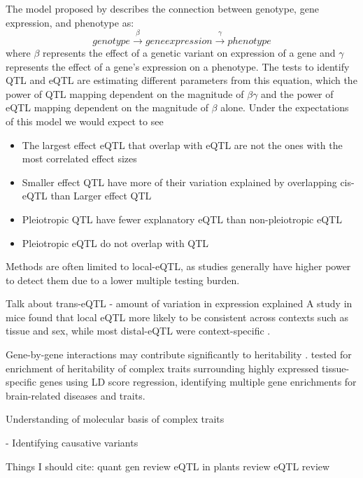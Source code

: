 \documentclass[article,9pt,twocolumn,twoside]{rilabRxiv}
\begin{document}
The model proposed by \cite{Mostafavi} describes the connection between genotype, gene expression, and phenotype as:
    \begin{equation} 
    \label{eqn:mostafavi}
   genotype\xrightarrow{\beta}gene expression\xrightarrow{\gamma}phenotype
    \end{equation}
where $\beta$ represents the effect of a genetic variant on expression of a gene and $\gamma$ represents the effect of a gene's expression on a phenotype. 
The tests to identify QTL and eQTL are estimating different parameters from this equation, which the power of QTL mapping dependent on the magnitude of $\beta\gamma$ and the power of eQTL mapping dependent on the magnitude of $\beta$ alone.
Under the expectations of this model we would expect to see
\begin{itemize}
\item{The largest effect eQTL that overlap with eQTL are not the ones with the most correlated effect sizes}
\item{Smaller effect QTL have more of their variation explained by overlapping cis-eQTL than Larger effect QTL}
\item{Pleiotropic QTL have fewer explanatory eQTL than non-pleiotropic eQTL}
\item{Pleiotropic eQTL do not overlap with QTL}
\end{itemize}

Methods are often limited to local-eQTL, as studies generally have higher power to detect them due to a lower multiple testing burden.

Talk about trans-eQTL - amount of variation in expression explained
A study in mice found that local eQTL more likely to be consistent across contexts such as tissue and sex, while most distal-eQTL were context-specific \citep{vanNas}.

Gene-by-gene interactions may contribute significantly to heritability \citep{Bloom}.
\cite{Finucane} tested for enrichment of heritability of complex traits surrounding highly expressed tissue-specific genes using LD score regression, identifying multiple gene enrichments for brain-related diseases and traits.


Understanding of molecular basis of complex traits
\citep{CivelekLusis}

\citep{Eichler}- Identifying causative variants 


Things I should cite:
\cite{Mackay} quant gen review
\cite{Druka} eQTL in plants review
\cite{Gilad} eQTL review
\end{document}
